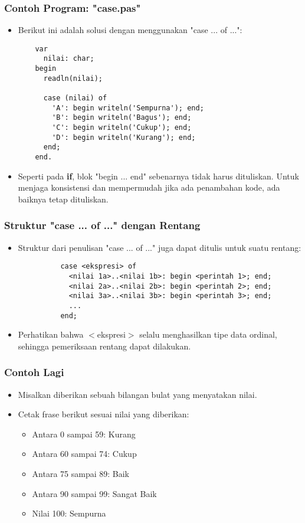 \begin{frame}[fragile]
\frametitle{Contoh Program: "case.pas"}
\begin{itemize}
  \item Berikut ini adalah solusi dengan menggunakan "case ... of ...":
  \begin{lstlisting}
    var
      nilai: char;
    begin
      readln(nilai);
      
      case (nilai) of
        'A': begin writeln('Sempurna'); end;
        'B': begin writeln('Bagus'); end;
        'C': begin writeln('Cukup'); end;
        'D': begin writeln('Kurang'); end;
      end;
    end.
  \end{lstlisting}
  \item Seperti pada \textbf{if}, blok "begin ... end" sebenarnya tidak harus dituliskan. Untuk menjaga konsistensi dan mempermudah \newline jika ada penambahan kode, ada baiknya tetap dituliskan.
\end{itemize}
\end{frame}

\begin{frame}[fragile]
    \frametitle{Struktur "case ... of ..." dengan Rentang}
    \begin{itemize}
        \item Struktur dari penulisan "case ... of ..." juga dapat ditulis untuk suatu rentang:
        \begin{lstlisting}
          case <ekspresi> of
            <nilai 1a>..<nilai 1b>: begin <perintah 1>; end;
            <nilai 2a>..<nilai 2b>: begin <perintah 2>; end;
            <nilai 3a>..<nilai 3b>: begin <perintah 3>; end;
            ...
          end;
        \end{lstlisting}
        
        \item Perhatikan bahwa $<$ekspresi$>$ selalu menghasilkan tipe data ordinal, sehingga pemeriksaan rentang dapat dilakukan.
    \end{itemize}
\end{frame}

\begin{frame}
\frametitle{Contoh Lagi}
\begin{itemize}
  \item Misalkan diberikan sebuah bilangan bulat yang menyatakan nilai.
  \item Cetak frase berikut sesuai nilai yang diberikan:
  \begin{itemize}
    \item Antara 0 sampai 59: Kurang
    \item Antara 60 sampai 74: Cukup
    \item Antara 75 sampai 89: Baik
    \item Antara 90 sampai 99: Sangat Baik
    \item Nilai 100: Sempurna
  \end{itemize}
\end{itemize}
\end{frame}

